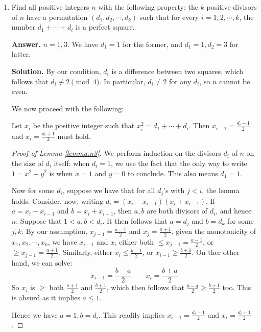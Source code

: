 \documentclass[11pt,a4paper]{article}
\begin{document}
\begin{enumerate}
		\item [N3.] 
		Find all positive integers $n$ with the following property: the $k$ positive divisors of $n$ have a permutation $(d_1,d_2, \cdots ,d_k)$ such that for every $i = 1,2,\cdots ,k$, 
		the number $d_1 + \cdots + d_i$ is a perfect square.
		
		\textbf{Answer.} $n=1, 3$. We have $d_1=1$ for the former, and $d_1=1, d_2=3$ for latter. 
		
		\textbf{Solution.} 
		By our condition, $d_i$ is a difference between two squares, 
		which follows that $d_i\not \equiv 2\pmod{4}$. 
		In particular, $d_i\neq 2$ for any $d_i$, so $n$ cannot be even.
		
		We now proceed with the following: 
		
		\begin{lemma}\label{lemma:n3}
			Let $x_i$ be the positive integer such that $x_i^2 = d_1 + \cdots + d_i$. 
			Then $x_{i-1}=\frac{d_i-1}{2}$ and $x_i=\frac{d_i + 1}{2}$ must hold. 
		\end{lemma}
		
		
		\begin{proof}[Proof of Lemma \ref{lemma:n3}]
			We perform induction on the divisors $d_i$ of $n$ on the size of $d_i$ itself: 
			when $d_i=1$, we use the fact that the only way to write $1=x^2-y^2$ is when $x=1$ and $y=0$ to conclude. 
			This also means $d_1=1$. 
			
			Now for some $d_i$, suppose we have that for all $d_j$'s with $j < i$, 
		    the lemma holds. 
		    Consider, now, writing $d_i = (x_i - x_{i - 1})(x_i + x_{i - 1})$, 
		    If $a = x_i - x_{i - 1}$ and $b = x_i + x_{i - 1}$, 
		    then $a, b$ are both divisors of $d_i$, and hence $n$. 
		    Suppose that $1<a, b<d_i$. 
		    It then follows that $a=d_j$ and $b=d_k$ for some $j, k$. 
		    By our assumption, $x_{j - 1} = \frac{a - 1}{2}$ and $x_{j} = \frac{a + 1}{2}$, 
		    given the monotonicity of $x_1, x_2, \cdots, x_k$, 
		    we have $x_{i-1}$ and $x_i$ either both $\le x_{j - 1} = \frac{a - 1}{2}$, 
		    or $\ge x_{j - 1} = \frac{a + 1}{2}$. 
		    Similarly, either $x_i\le \frac{b-1}{2}$, or $x_{i-1}\ge \frac{b+1}{2}$. 
		    On ther other hand, we can solve: 
		    \[
		    x_{i-1} = \frac{b-a}{2}
		    \qquad 
		    x_i = \frac{b+a}{2}
		    \]
		    So $x_i$ is $\ge$ both $\frac{a+1}{2}$ and $\frac{b+1}{2}$, 
		    which then follows that 
		    $\frac{b-a}{2}\ge \frac{b+1}{2}$ too. 
		    This is absurd as it implies $a\le 1$. 
		    
		    Hence we have $a=1, b=d_i$. This readily implies $x_{i-1}=\frac{d_i-1}{2}$ and $x_i = \frac{d_i+1}{2}$. 
		    

\end{proof}
\end{enumerate}
\end{document}

